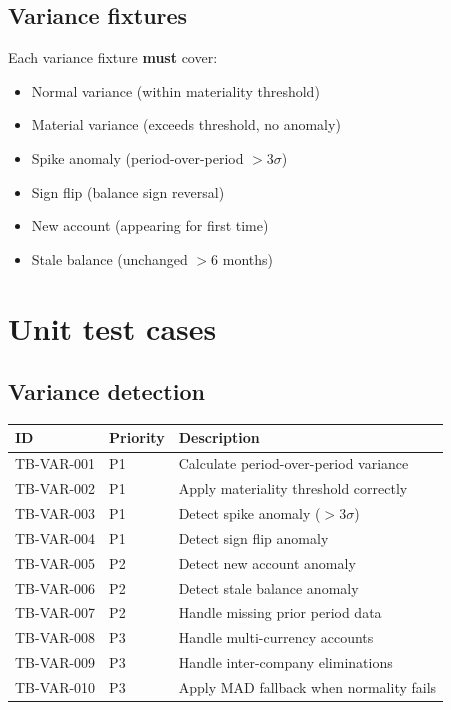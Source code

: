 \documentclass[11pt,a4paper,twoside]{report}
\begin{document}
\subsection{Variance fixtures}

Each variance fixture \textbf{must} cover:
\begin{itemize}
\item Normal variance (within materiality threshold)
\item Material variance (exceeds threshold, no anomaly)
\item Spike anomaly (period-over-period $>3\sigma$)
\item Sign flip (balance sign reversal)
\item New account (appearing for first time)
\item Stale balance (unchanged $>$6 months)
\end{itemize}

\section{Unit test cases}

\subsection{Variance detection}

\begin{tabularx}{\linewidth}{@{}l l X@{}}
\toprule
\textbf{ID} & \textbf{Priority} & \textbf{Description} \\ \midrule
TB-VAR-001 & P1 & Calculate period-over-period variance \\
TB-VAR-002 & P1 & Apply materiality threshold correctly \\
TB-VAR-003 & P1 & Detect spike anomaly ($>3\sigma$) \\
TB-VAR-004 & P1 & Detect sign flip anomaly \\
TB-VAR-005 & P2 & Detect new account anomaly \\
TB-VAR-006 & P2 & Detect stale balance anomaly \\
TB-VAR-007 & P2 & Handle missing prior period data \\
TB-VAR-008 & P3 & Handle multi-currency accounts \\
TB-VAR-009 & P3 & Handle inter-company eliminations \\
TB-VAR-010 & P3 & Apply MAD fallback when normality fails \\
\bottomrule
\end{tabularx}
\end{document}
